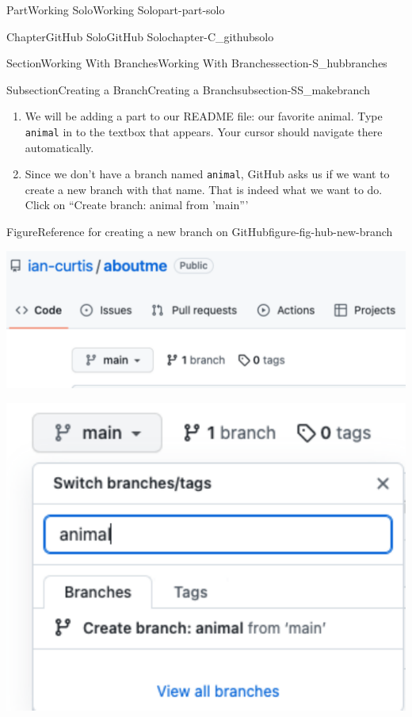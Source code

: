 \documentclass[twoside,10pt,]{book}
\newcommand{\mono}[1]{\texttt{#1}}
\begin{document}
\begin{partptx}{Part}{Working Solo}{}{Working Solo}{}{}{part-part-solo}
\begin{chapterptx}{Chapter}{GitHub Solo}{}{GitHub Solo}{}{}{chapter-C_githubsolo}
\begin{sectionptx}{Section}{Working With Branches}{}{Working With Branches}{}{}{section-S_hubbranches}
\begin{subsectionptx}{Subsection}{Creating a Branch}{}{Creating a Branch}{}{}{subsection-SS_makebranch}
\begin{enumerate}
\item{}We will be adding a part to our README file: our favorite animal. Type \mono{animal} in to the textbox that appears. Your cursor should navigate there automatically.%
\item{}Since we don't have a branch named \mono{animal}, GitHub asks us if we want to create a new branch with that name. That is indeed what we want to do. Click on ``Create branch: animal from 'main'''%
\end{enumerate}
%
\begin{figureptx}{Figure}{Reference for creating a new branch on GitHub}{figure-fig-hub-new-branch}{}%
\begin{sidebyside}{2}{0}{0}{0}%
\begin{sbspanel}{0.5}%
\includegraphics[width=\linewidth]{external/hub_new_branch.pdf}
\end{sbspanel}%
\begin{sbspanel}{0.5}%
\includegraphics[width=\linewidth]{external/hub_new_branch_animal.pdf}
\end{sbspanel}%
\end{sidebyside}%
\tcblower
\end{figureptx}%

\end{subsectionptx}
\end{sectionptx}
\end{chapterptx}
\end{partptx}
\end{document}
